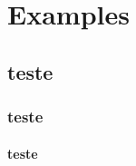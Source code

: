 
\chapter{Examples}
\label{chap:examples}

\section{teste}
\subsection{teste}
\subsubsection{teste}









